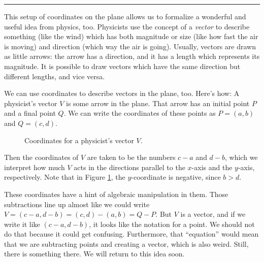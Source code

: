 \documentclass[00-livre-main.tex]{subfiles}
\begin{document}
\vspace{.5cm}
\hrule
\vspace{.5cm}

This setup of coordinates on the plane allows us to formalize a wonderful and useful idea from physics, too. 
Physicists use the concept of a \emph{vector} to describe something (like the wind) which has both magnitude or size (like how fast the air is moving)  and direction (which way the air is going).
Usually, vectors are drawn as little arrows: the arrow has a direction, and it has a length which represents its magnitude.
It is possible to draw vectors which have the same direction but different lengths, and vice versa.

We can use coordinates to describe vectors in the plane, too. 
Here's how: A physicist's vector $V$ is some arrow in the plane.
That arrow has an initial point $P$ and a final point $Q$.
We can write the coordinates of these points as $P = (a,b)$ and $Q = (c,d)$.

\begin{figure}[h]
\centering
{}
\caption{Coordinates for a physicist's vector $V$.}
\label{fig:phys-vec-coords}
\end{figure}


Then the coordinates of $V$ are taken to be the numbers $c-a$ and  $d-b$, which we interpret how much $V$ acts in the directions parallel to the $x$-axis and the $y$-axis, respectively. 
Note that in Figure \ref{fig:phys-vec-coords}, the $y$-coordinate is negative, since $b>d$.

These coordinates have a hint of algebraic manipulation in them. 
Those subtractions line up almost like we could write $V =(c-a,d-b) = (c,d)-(a,b) = Q-P$. 
But $V$ is a vector, and if we write it like $(c-a,d-b)$, it looks like the notation for a point. 
We should not do that because it could get confusing.
Furthermore, that ``equation'' would mean that we are subtracting points and creating a vector, which is also weird.
Still, there is something there.
We will return to this idea soon.
\end{document}
